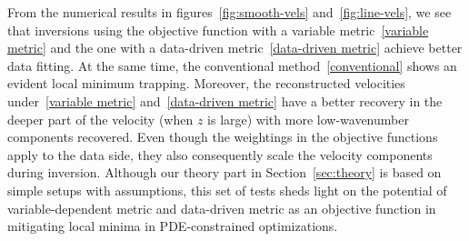 \documentclass[12pt]{amsart}
\begin{document}
From the numerical results in figures~\ref{fig:smooth-vels} and~\ref{fig:line-vels}, we see that inversions using the objective function with a variable metric~\eqref{variable metric} and the one with a data-driven metric~\eqref{data-driven metric} achieve better data fitting. At the same time, the conventional method~\eqref{conventional} shows an evident local minimum trapping. Moreover, the reconstructed velocities under~\eqref{variable metric} and~\eqref{data-driven metric} have a better recovery in the deeper part of the velocity (when $z$ is large) with more low-wavenumber components recovered. Even though the weightings in the objective functions apply to the data side, they also consequently scale the velocity components during inversion. Although our theory part in Section~\ref{sec:theory} is based on simple setups with assumptions, this set of tests sheds light on the potential of variable-dependent metric and data-driven metric as an objective function in mitigating local minima in PDE-constrained optimizations.
\end{document}

